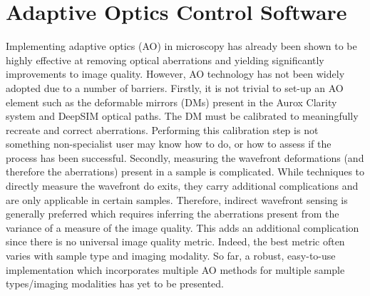 \chapter{Adaptive Optics Control Software}
\label{chpt:ao_tools}

Implementing adaptive optics (AO) in microscopy has already been shown to be highly effective at removing optical aberrations and yielding significantly improvements to image quality\cite{booth2014adaptive,girkin2009adaptive}. However, AO technology has not been widely adopted due to a number of barriers. Firstly, it is not trivial to set-up an AO element such as the deformable mirrors (DMs) present in the Aurox Clarity system and DeepSIM optical paths. The DM must be calibrated to meaningfully recreate and correct aberrations. Performing this calibration step is not something non-specialist user may know how to do, or how to assess if the process has been successful. Secondly, measuring the wavefront deformations (and therefore the aberrations) present in a sample is complicated. While techniques to directly measure the  wavefront do exits, they carry additional complications and are only applicable in certain samples\cite{wang2014rapid,wang2015direct}. Therefore, indirect wavefront sensing is generally preferred which requires inferring the aberrations present from the variance of a measure of the image quality\cite{rodriguez2018adaptive}. This adds an additional complication since there is no universal image quality metric. Indeed, the best metric often varies with sample type and imaging modality\cite{burke2015adaptive,booth2002adaptive,fienup2003aberration,debarre2008adaptive}. So far, a robust, easy-to-use implementation which incorporates multiple AO methods for multiple sample types/imaging modalities has yet to be presented\cite{ji2017adaptive}.

